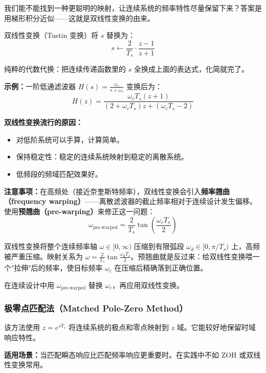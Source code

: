 我们能不能找到一种更聪明的映射，让连续系统的频率特性尽量保留下来？答案是用梯形积分近似——这就是双线性变换的由来。

双线性变换（Tustin 变换）将 $s$ 替换为：
\begin{equation}
s \leftarrow \frac{2}{T_s} \cdot \frac{z - 1}{z + 1}
\end{equation}

纯粹的代数代换：把连续传递函数里的 $s$ 全换成上面的表达式，化简就完了。

\textbf{示例：}一阶低通滤波器 $H(s) = \frac{\omega_c}{s + \omega_c}$ 变换后为：
\begin{equation}
H(z) = \frac{\omega_c T_s (z + 1)}{(2 + \omega_c T_s) z + (\omega_c T_s - 2)}
\end{equation}

\textbf{双线性变换流行的原因：}
\begin{itemize}
    \item 对低阶系统可以手算，计算简单。
    \item 保持稳定性：稳定的连续系统映射到稳定的离散系统。
    \item 低频段的频域匹配效果好。
\end{itemize}

\textbf{注意事项：}在高频处（接近奈奎斯特频率），双线性变换会引入\textbf{频率翘曲（frequency warping）}——离散滤波器的截止频率相对于连续设计发生偏移。使用\textbf{预翘曲（pre-warping）}来修正这一问题：
\begin{equation}
\omega_{\text{pre-warped}} = \frac{2}{T_s} \tan\left(\frac{\omega_c T_s}{2}\right)
\end{equation}

双线性变换将整个连续频率轴 $\omega \in [0, \infty)$ 压缩到有限弧段 $\omega_d \in [0, \pi/T_s)$ 上，高频被严重压缩。映射关系为 $\omega = \frac{2}{T_s}\tan\frac{\omega_d T_s}{2}$。预翘曲就是反过来：给双线性变换喂一个"拉伸"后的频率，使目标频率 $\omega_c$ 在压缩后精确落到正确位置。

在连续设计中用 $\omega_{\text{pre-warped}}$ 替换 $\omega_c$，再应用双线性变换。

\subsubsection{极零点匹配法（Matched Pole-Zero Method）}

该方法使用 $z = e^{sT_s}$ 将连续系统的极点和零点映射到 $z$ 域。它能较好地保留时域响应特性。

\textbf{适用场景：}当匹配瞬态响应比匹配频率响应更重要时。在实践中不如 ZOH 或双线性变换常用。

